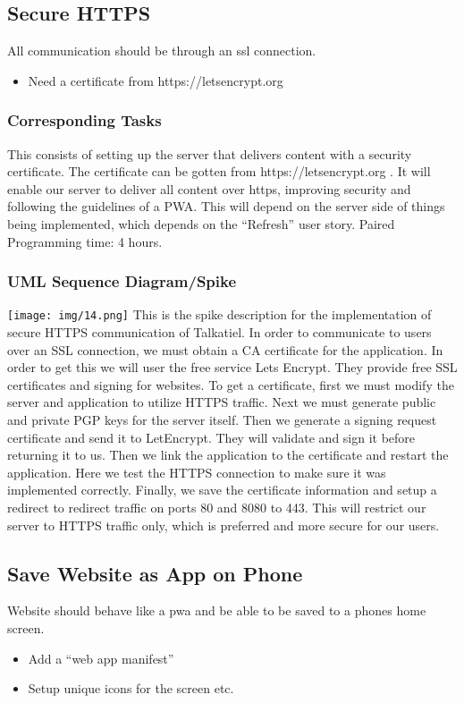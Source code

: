 \documentclass[12pt]{article}
\begin{document}
\subsection{Secure HTTPS}
All communication should be through an ssl connection.
\begin{itemize}
  \item Need a certificate from https://letsencrypt.org
\end{itemize}
\subsubsection{Corresponding Tasks}
	This consists of setting up the server that delivers content with a security certificate.  The certificate can be gotten from https://letsencrypt.org .  It will enable our server to deliver all content over https, improving security and following the guidelines of a PWA.  This will depend on the server side of things being implemented, which depends on the “Refresh” user story.  Paired Programming time: 4 hours.
\subsubsection{UML Sequence Diagram/Spike}
\texttt{[image: img/14.png]}\linebreak
This is the spike description for the implementation of secure HTTPS communication of Talkatiel.  In order to communicate to users over an SSL connection, we must obtain a CA certificate for the application.  In order to get this we will user the free service Lets Encrypt.  They provide free SSL certificates and signing for websites.  To get a certificate, first we must modify the server and application to utilize HTTPS traffic.  Next we must generate public and private PGP keys for the server itself.  Then we generate a signing request certificate and send it to LetEncrypt.  They will validate and sign it before returning it to us.  Then we link the application to the certificate and restart the application.  Here we test the HTTPS connection to make sure it was implemented correctly.  Finally, we save the certificate information and setup a redirect to redirect traffic on ports 80 and 8080 to 443.  This will restrict our server to HTTPS traffic only, which is preferred and more secure for our users.


\subsection{Save Website as App on Phone}
Website should behave like a pwa and be able to be saved to a phones home screen.
\begin{itemize}
  \item Add a “web app manifest”
  \item Setup unique icons for the screen etc.
\end{itemize}
\end{document}
